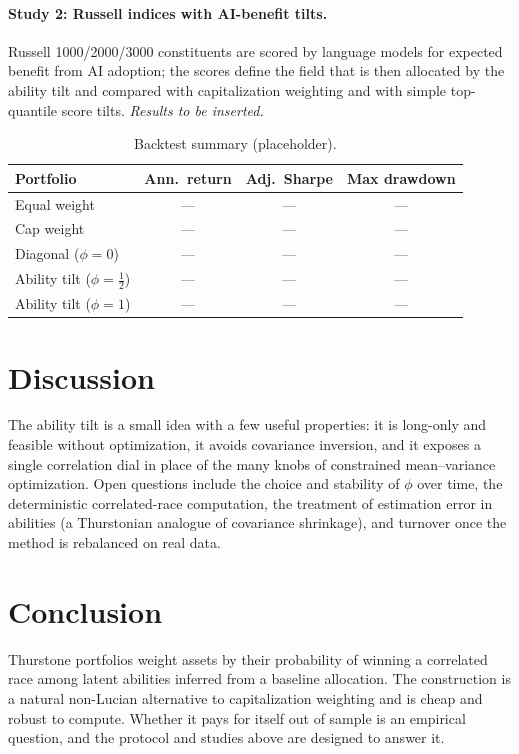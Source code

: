 \documentclass[11pt]{article}
\begin{document}
\paragraph{Study 2: Russell indices with AI-benefit tilts.}
Russell 1000/2000/3000 constituents are scored by language models for expected
benefit from AI adoption; the scores define the field that is then allocated by
the ability tilt and compared with capitalization weighting and with simple
top-quantile score tilts. \emph{Results to be inserted.}

\begin{table}[h]
  \centering
  \caption{Backtest summary (placeholder).}
  \label{tab:results}
  \begin{tabular}{lccc}
    \toprule
    Portfolio & Ann.\ return & Adj.\ Sharpe & Max drawdown \\
    \midrule
    Equal weight        & --- & --- & --- \\
    Cap weight          & --- & --- & --- \\
    Diagonal ($\phi{=}0$) & --- & --- & --- \\
    Ability tilt ($\phi{=}\tfrac12$) & --- & --- & --- \\
    Ability tilt ($\phi{=}1$) & --- & --- & --- \\
    \bottomrule
  \end{tabular}
\end{table}

\section{Discussion}
\label{sec:discussion}

The ability tilt is a small idea with a few useful properties: it is long-only
and feasible without optimization, it avoids covariance inversion, and it exposes
a single correlation dial in place of the many knobs of constrained
mean--variance optimization. Open questions include the choice and stability of
$\phi$ over time, the deterministic correlated-race computation, the treatment of
estimation error in abilities (a Thurstonian analogue of covariance shrinkage),
and turnover once the method is rebalanced on real data.

\section{Conclusion}
\label{sec:conclusion}

Thurstone portfolios weight assets by their probability of winning a correlated
race among latent abilities inferred from a baseline allocation. The construction
is a natural non-Lucian alternative to capitalization weighting and is cheap and
robust to compute. Whether it pays for itself out of sample is an empirical
question, and the protocol and studies above are designed to answer it.

\printbibliography
\end{document}

